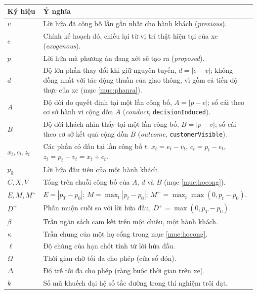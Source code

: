 \begin{longtable}{@{}p{2.6cm}p{12.2cm}@{}}
\toprule
\textbf{Ký hiệu} & \textbf{Ý nghĩa}\\
\midrule
\endhead
$v$ & Lời hứa đã công bố lần gần nhất cho hành khách (\emph{previous}).\\
$e$ & Chính kế hoạch đó, chiếu lại từ vị trí thật hiện tại của xe (\emph{exogenous}).\\
$p$ & Lời hứa mà phương án đang xét sẽ tạo ra (\emph{proposed}).\\
$d$ & Độ lớn phần thay đổi khi giữ nguyên tuyến, $d = |e-v|$; không đồng nhất với tác động thuần
của giao thông, vì gồm cả tiến độ thực của xe (mục \ref{muc:phanra}).\\
$A$ & Độ dời do quyết định tại một lần công bố, $A = |p-e|$; sổ cái theo cơ sở hành vi cộng dồn
$A$ (\emph{conduct}, \texttt{decisionInduced}).\\
$B$ & Độ dời khách nhìn thấy tại một lần công bố, $B = |p-v|$; sổ cái theo cơ sở kết quả cộng dồn
$B$ (\emph{outcome}, \texttt{customerVisible}).\\
$x_t, c_t, z_t$ & Các phần có dấu tại lần công bố $t$: $x_t = e_t - v_t$, $c_t = p_t - e_t$,
$z_t = p_t - v_t = x_t + c_t$.\\
$p_0$ & Lời hứa đầu tiên của một hành khách.\\
$C, X, V$ & Tổng trên chuỗi công bố của $A$, $d$ và $B$ (mục \ref{muc:hocong}).\\
$E, M, M^{+}$ & $E = |p_T - p_0|$; $M = \max_t |p_t - p_0|$; $M^{+} = \max_t \max(0, p_t - p_0)$.\\
$D^{+}$ & Phần muộn cuối so với lời hứa đầu, $D^{+} = \max(0, p_T - p_0)$.\\
$\beta$ & Trần ngân sách cam kết trên một chiều, một hành khách.\\
$\kappa$ & Trần chung của một họ cổng trong mục \ref{muc:hocong}.\\
$\ell$ & Độ chùng của hạn chót tính từ lời hứa đầu.\\
$\Omega$ & Thời gian chờ tối đa cho phép (cửa sổ đón).\\
$\Delta$ & Độ trễ tối đa cho phép (ràng buộc thời gian trên xe).\\
$k$ & Số mũ khuếch đại hệ số tắc đường trong thí nghiệm trôi dạt.\\
\bottomrule
\end{longtable}

\clearpage
